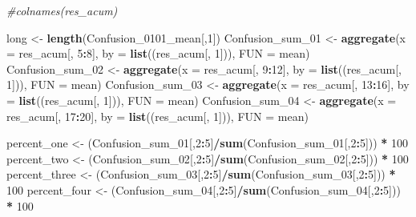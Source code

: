 \documentclass[]{book}
\newenvironment{Shaded}{\begin{snugshade}}{\end{snugshade}}
\newcommand{\KeywordTok}[1]{\textcolor[rgb]{0.13,0.29,0.53}{\textbf{{#1}}}}
\newcommand{\DataTypeTok}[1]{\textcolor[rgb]{0.13,0.29,0.53}{{#1}}}
\newcommand{\DecValTok}[1]{\textcolor[rgb]{0.00,0.00,0.81}{{#1}}}
\newcommand{\StringTok}[1]{\textcolor[rgb]{0.31,0.60,0.02}{{#1}}}
\newcommand{\CommentTok}[1]{\textcolor[rgb]{0.56,0.35,0.01}{\textit{{#1}}}}
\newcommand{\OperatorTok}[1]{\textcolor[rgb]{0.81,0.36,0.00}{\textbf{{#1}}}}
\newcommand{\NormalTok}[1]{{#1}}
\theoremstyle{definition}
\theoremstyle{definition}
\theoremstyle{definition}
\theoremstyle{remark}
\begin{document}
\begin{Shaded}
\begin{Highlighting}[]
\CommentTok{#colnames(res_acum)}

\NormalTok{long <-}\StringTok{ }\KeywordTok{length}\NormalTok{(Confusion_0101_mean[,}\DecValTok{1}\NormalTok{])}
\NormalTok{Confusion_sum_}\DecValTok{01}\NormalTok{ <-}\StringTok{ }\KeywordTok{aggregate}\NormalTok{(}\DataTypeTok{x =}\NormalTok{ res_acum[, }\DecValTok{5}\OperatorTok{:}\DecValTok{8}\NormalTok{], }\DataTypeTok{by =} \KeywordTok{list}\NormalTok{((res_acum[, }\DecValTok{1}\NormalTok{])), }\DataTypeTok{FUN =}\NormalTok{ mean)}
\NormalTok{Confusion_sum_}\DecValTok{02}\NormalTok{ <-}\StringTok{ }\KeywordTok{aggregate}\NormalTok{(}\DataTypeTok{x =}\NormalTok{ res_acum[, }\DecValTok{9}\OperatorTok{:}\DecValTok{12}\NormalTok{], }\DataTypeTok{by =} \KeywordTok{list}\NormalTok{((res_acum[, }\DecValTok{1}\NormalTok{])), }\DataTypeTok{FUN =}\NormalTok{ mean)}
\NormalTok{Confusion_sum_}\DecValTok{03}\NormalTok{ <-}\StringTok{ }\KeywordTok{aggregate}\NormalTok{(}\DataTypeTok{x =}\NormalTok{ res_acum[, }\DecValTok{13}\OperatorTok{:}\DecValTok{16}\NormalTok{], }\DataTypeTok{by =} \KeywordTok{list}\NormalTok{((res_acum[, }\DecValTok{1}\NormalTok{])), }\DataTypeTok{FUN =}\NormalTok{ mean)}
\NormalTok{Confusion_sum_}\DecValTok{04}\NormalTok{ <-}\StringTok{ }\KeywordTok{aggregate}\NormalTok{(}\DataTypeTok{x =}\NormalTok{ res_acum[, }\DecValTok{17}\OperatorTok{:}\DecValTok{20}\NormalTok{], }\DataTypeTok{by =} \KeywordTok{list}\NormalTok{((res_acum[, }\DecValTok{1}\NormalTok{])), }\DataTypeTok{FUN =}\NormalTok{ mean)}

\NormalTok{percent_one <-}\StringTok{ }\NormalTok{(Confusion_sum_}\DecValTok{01}\NormalTok{[,}\DecValTok{2}\OperatorTok{:}\DecValTok{5}\NormalTok{]}\OperatorTok{/}\KeywordTok{sum}\NormalTok{(Confusion_sum_}\DecValTok{01}\NormalTok{[,}\DecValTok{2}\OperatorTok{:}\DecValTok{5}\NormalTok{])) }\OperatorTok{*}\StringTok{ }\DecValTok{100}
\NormalTok{percent_two <-}\StringTok{ }\NormalTok{(Confusion_sum_}\DecValTok{02}\NormalTok{[,}\DecValTok{2}\OperatorTok{:}\DecValTok{5}\NormalTok{]}\OperatorTok{/}\KeywordTok{sum}\NormalTok{(Confusion_sum_}\DecValTok{02}\NormalTok{[,}\DecValTok{2}\OperatorTok{:}\DecValTok{5}\NormalTok{])) }\OperatorTok{*}\StringTok{ }\DecValTok{100}
\NormalTok{percent_three <-}\StringTok{ }\NormalTok{(Confusion_sum_}\DecValTok{03}\NormalTok{[,}\DecValTok{2}\OperatorTok{:}\DecValTok{5}\NormalTok{]}\OperatorTok{/}\KeywordTok{sum}\NormalTok{(Confusion_sum_}\DecValTok{03}\NormalTok{[,}\DecValTok{2}\OperatorTok{:}\DecValTok{5}\NormalTok{])) }\OperatorTok{*}\StringTok{ }\DecValTok{100}
\NormalTok{percent_four <-}\StringTok{ }\NormalTok{(Confusion_sum_}\DecValTok{04}\NormalTok{[,}\DecValTok{2}\OperatorTok{:}\DecValTok{5}\NormalTok{]}\OperatorTok{/}\KeywordTok{sum}\NormalTok{(Confusion_sum_}\DecValTok{04}\NormalTok{[,}\DecValTok{2}\OperatorTok{:}\DecValTok{5}\NormalTok{])) }\OperatorTok{*}\StringTok{ }\DecValTok{100}



\end{Highlighting}
\end{Shaded}
\end{document}
